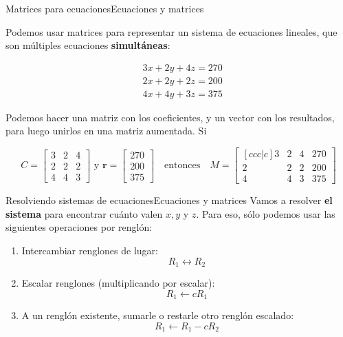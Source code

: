 \documentclass[spanish, c]{beamer}
\begin{document}
\begin{frame}{Matrices para ecuaciones}{Ecuaciones y matrices}

    Podemos usar matrices para representar un \alert{sistema de ecuaciones lineales}, que son múltiples ecuaciones \textbf{simultáneas}: \pause

    \begin{align*}
        & 3x + 2y + 4z = 270 \\
        & 2x + 2y + 2z = 200 \\
        & 4x + 4y + 3z = 375
    \end{align*} \pause

    Podemos hacer una matriz con los coeficientes, y un vector con los resultados, para luego unirlos en una \alert{matriz aumentada}. Si 

    \[
        C = \begin{bmatrix*}
            3 & 2 & 4 \\
            2 & 2 & 2 \\
            4 & 4 & 3
        \end{bmatrix*} \text{ y }
        \mathbf{r} =
        \begin{bmatrix*}
            270 \\ 200 \\ 375
        \end{bmatrix*} \quad \text{entonces} \quad
        M = \begin{bmatrix}[ccc|c]
            3 & 2 & 4 & 270 \\
            2 & 2 & 2 & 200 \\
            4 & 4 & 3 & 375
        \end{bmatrix}    
    \]   

\end{frame}

\begin{frame}{Resolviendo sistemas de ecuaciones}{Ecuaciones y matrices}
    Vamos a \alert{resolver} \textbf{el sistema} para encontrar cuánto valen $x, y$ y $z$.
    Para eso, sólo podemos usar las siguientes \alert{operaciones por renglón}: \pause

    \bigskip

    \begin{enumerate}[<+->]
        \item Intercambiar renglones de lugar: $$R_1 \leftrightarrow R_2$$
        \item Escalar renglones (multiplicando por escalar): $$R_1 \leftarrow cR_1$$
        \item A un renglón existente, sumarle o restarle otro renglón escalado: $$R_1 \leftarrow R_1 - cR_2$$
    \end{enumerate}
\end{frame}
\end{document}
